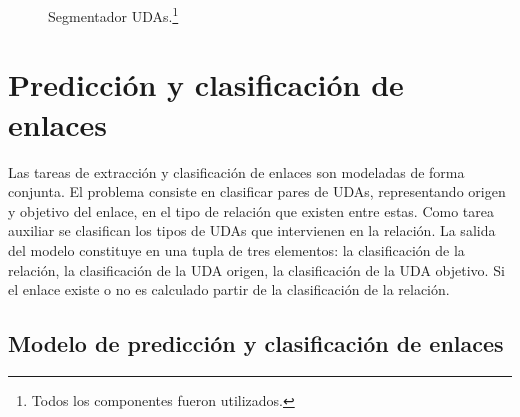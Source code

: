 \documentclass[a4paper,11pt,twocolumn,twoside]{article}
\begin{document}
\begin{figure}[h]
	\centering
	
	\caption{Segmentador UDAs.\footnote{Todos los componentes fueron utilizados.}}
	\label{fig:segmenter_model}
\end{figure}

\section{Predicción y clasificación de enlaces}


	
Las tareas de extracción y clasificación de enlaces son modeladas de forma conjunta.
El problema consiste en clasificar pares de UDAs, representando origen y objetivo del enlace, 
en el tipo de relación que existen entre estas.
Como tarea auxiliar se clasifican los tipos de UDAs que intervienen en la relación. La salida 
del modelo constituye en una tupla de tres elementos: la clasificación de la relación, 
la clasificación de la UDA origen, la clasificación de la UDA objetivo. Si el enlace existe o no 
es calculado partir de la clasificación de la relación.   

\subsection{Modelo de predicción y clasificación de enlaces}
\end{document}
